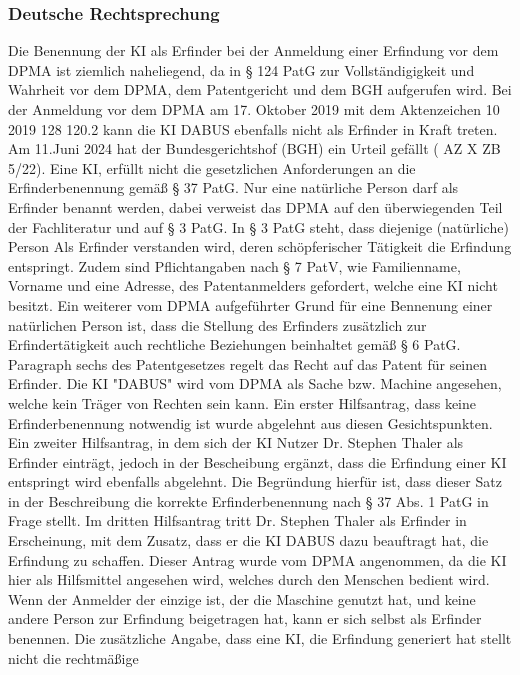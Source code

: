 \subsubsection{Deutsche Rechtsprechung}
Die Benennung der KI als Erfinder 
bei der Anmeldung einer Erfindung vor dem DPMA
ist ziemlich naheliegend, 
da in § 124 PatG zur Vollständigigkeit und Wahrheit vor dem
DPMA, 
dem Patentgericht und dem BGH aufgerufen wird.
Bei der Anmeldung vor dem DPMA am 17. Oktober 2019 mit dem Aktenzeichen
10 2019 128 120.2 kann die KI 
DABUS ebenfalls nicht als Erfinder in Kraft treten. 
Am 11.Juni 2024 hat der Bundesgerichtshof (BGH) ein Urteil gefällt 
( AZ X ZB 5/22).
Eine KI, 
erfüllt nicht die gesetzlichen Anforderungen an die Erfinderbenennung 
gemäß § 37 PatG. 
Nur eine natürliche Person darf 
als Erfinder benannt werden, 
dabei verweist das DPMA auf den überwiegenden Teil
der Fachliteratur und auf § 3 PatG.
In § 3 PatG steht, dass diejenige (natürliche) Person Als
Erfinder 
verstanden wird, 
deren schöpferischer Tätigkeit die Erfindung entspringt.
Zudem sind Pflichtangaben nach § 7 PatV, wie 
Familienname, Vorname und eine Adresse, 
des Patentanmelders gefordert,
welche eine KI nicht besitzt. 
Ein weiterer vom DPMA aufgeführter Grund für eine 
Bennenung einer natürlichen Person ist, dass 
die Stellung des Erfinders zusätzlich zur Erfindertätigkeit
auch rechtliche Beziehungen beinhaltet gemäß § 6 PatG.
Paragraph sechs des Patentgesetzes regelt das Recht auf
das Patent für seinen Erfinder.
Die KI "DABUS" wird vom DPMA als 
Sache bzw. Machine angesehen, 
welche kein Träger von Rechten sein kann.
Ein erster Hilfsantrag, dass keine Erfinderbenennung notwendig 
ist wurde abgelehnt aus diesen Gesichtspunkten.
Ein zweiter Hilfsantrag, in dem sich der KI Nutzer
Dr. Stephen Thaler als Erfinder einträgt, 
jedoch in der Bescheibung ergänzt, dass die Erfindung
einer KI entspringt wird ebenfalls abgelehnt.
Die Begründung hierfür ist, dass dieser Satz in der 
Beschreibung die korrekte Erfinderbenennung nach
§ 37 Abs. 1 PatG in Frage stellt.
Im dritten Hilfsantrag tritt Dr. Stephen Thaler
als Erfinder in Erscheinung, mit dem 
Zusatz, dass er die KI DABUS dazu beauftragt hat,
die Erfindung zu schaffen.
Dieser Antrag wurde vom DPMA angenommen,
da die KI hier als Hilfsmittel angesehen wird,
welches durch den Menschen bedient wird.
Wenn der Anmelder der einzige ist, 
der die Maschine genutzt hat, 
und keine andere Person zur Erfindung beigetragen hat, 
kann er sich selbst als Erfinder benennen. 
Die zusätzliche Angabe, dass eine KI, die Erfindung
generiert hat stellt nicht die rechtmäßige
